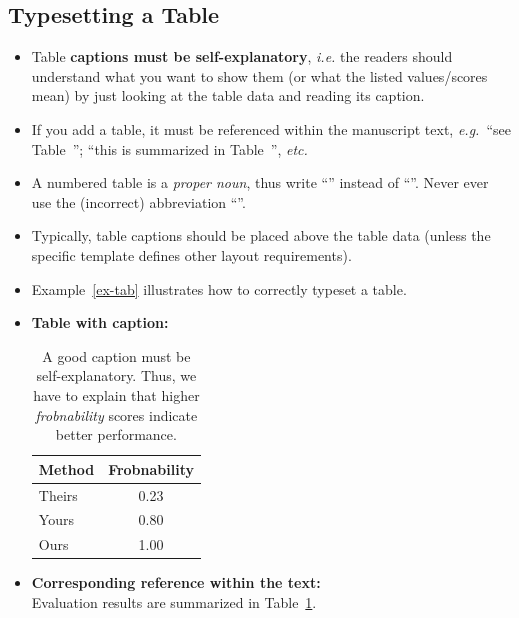 \documentclass[11pt,a4paper]{article}
\begin{document}
\subsection{Typesetting a Table}
\noindent
\begin{itemize}
 \item Table \textbf{captions must be self-explanatory}, \emph{i.e.} the readers should understand what you want to show them (or what the listed values/scores mean) by just looking at the table data and reading its caption.
 
 \item If you add a table, it must be referenced within the manuscript text, \emph{e.g.}~``see Table~''; ``this is summarized in Table~'', \emph{etc.}
 
 \item A numbered table is a \emph{proper noun}, thus write ``'' instead of ``''. Never ever use the (incorrect) abbreviation ``''.
 
 \item Typically, table captions should be placed above the table data (unless the specific template defines other layout requirements).
 
 \item Example~\ref{ex-tab} illustrates how to correctly typeset a table.
\end{itemize}
% 
% 
\begin{texexample}
  \label{ex-tab}
  \begin{itemize}[leftmargin=1em]
  \item \textbf{Table with caption:}
  \begin{table}[H]
    \centering
    \caption{A good caption must be self-explanatory. Thus, we have to explain that higher \emph{frobnability} scores indicate better performance.}
    \label{tab-example1}
    \begin{tabular}{l|c}
      \hline
      \textbf{Method} & \textbf{Frobnability}\\\hline
      Theirs & 0.23 \\
      Yours  & 0.80 \\
      Ours   & 1.00 \\\hline
    \end{tabular}
  \end{table}
  \vspace{-0.5em}
  
  \item\textbf{Corresponding reference within the text:}\\
  Evaluation results are summarized in Table~\ref{tab-example1}.
  \end{itemize}
    
\end{texexample}
\end{document}
